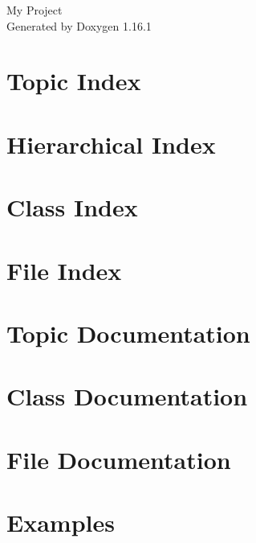 \documentclass[twoside]{book}
\newcommand{\+}{\discretionary{\mbox{\scriptsize$\hookleftarrow$}}{}{}}
\newcommand{\clearemptydoublepage}{%
    \newpage{\pagestyle{empty}\cleardoublepage}%
  }
\begin{document}
  \raggedbottom
    \hypersetup{pageanchor=false,
                bookmarksnumbered=true,
                pdfencoding=unicode
               }
  \begin{titlepage}
  \vspace*{7cm}
  \begin{center}%
  {\Large My Project}\\
  \vspace*{1cm}
  {\large Generated by Doxygen 1.16.1}\\
  \end{center}
  \end{titlepage}
  \clearemptydoublepage
  \tableofcontents
  \clearemptydoublepage
  \hypersetup{pageanchor=true}

\chapter{Topic Index}

\chapter{Hierarchical Index}

\chapter{Class Index}

\chapter{File Index}

\chapter{Topic Documentation}



\chapter{Class Documentation}



\chapter{File Documentation}







\chapter{Examples}

  \backmatter
  \newpage
  \clearemptydoublepage
  \printindex
\end{document}
